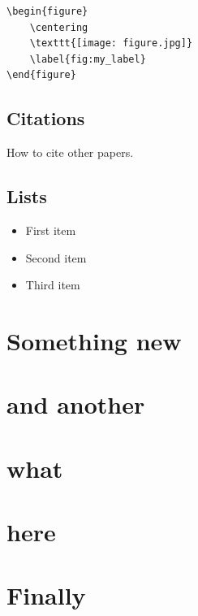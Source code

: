 \documentclass{phoebe}
\begin{document}
\begin{lstlisting}
\begin{figure}
    \centering
    \texttt{[image: figure.jpg]}
    \label{fig:my_label}
\end{figure}
\end{lstlisting}

\subsection{Citations}

How to cite other papers. \cite{Adamo+2017,Anand+2021a}

\Blindtext

\subsection{Lists}

\begin{itemize}
    \item First item
    \item Second item
    \item Third item
\end{itemize}

\Blindtext

\section{Something new}

\Blindtext

\section{and another}

\Blindtext 

\section{what}

\Blindtext 

\section{here}

\Blindtext 

\section{Finally}
\end{document}
